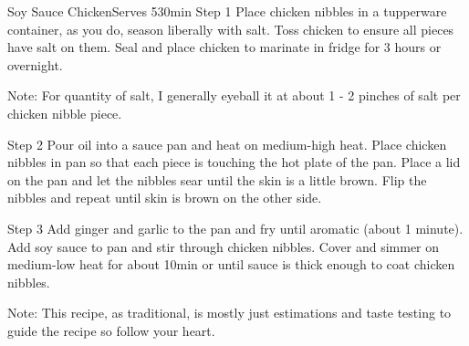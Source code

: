 \begin{recipe}{Soy Sauce Chicken}{Serves 5}{30min}
Step 1
Place chicken nibbles in a tupperware container, as you do, season liberally with salt. Toss chicken to ensure all pieces have salt on them. Seal and place chicken to marinate in fridge for 3 hours or overnight.

Note: For quantity of salt, I generally eyeball it at about 1 - 2 pinches of salt per chicken nibble piece.

Step 2
Pour oil into a sauce pan and heat on medium-high heat. Place chicken nibbles in pan so that each piece is touching the hot plate of the pan. Place a lid on the pan and let the nibbles sear until the skin is a little brown. Flip the nibbles and repeat until skin is brown on the other side.

Step 3
Add ginger and garlic to the pan and fry until aromatic (about 1 minute). Add soy sauce to pan and stir through chicken nibbles. Cover and simmer on medium-low heat for about 10min or until sauce is thick enough to coat chicken nibbles.

Note: This recipe, as traditional, is mostly just estimations and taste testing to guide the recipe so follow your heart.
\end{recipe}

